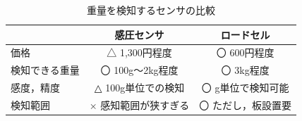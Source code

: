 \begin{table}[htb]
\begin{center}
\caption{重量を検知するセンサの比較}
\begin{tabular}{|l|c|c|} \hline
 & 感圧センサ & ロードセル \\ \hline \hline
価格 & △ 1,300円程度 & 〇 600円程度 \\
検知できる重量 & 〇 100g～2kg程度  & 〇 3kg程度 \\ 
感度，精度 & △ 100g単位での検知 & 〇 g単位で検知可能 \\
検知範囲 & × 感知範囲が狭すぎる & 〇 ただし，板設置要 \\ \hline
\end{tabular}
\label{rodo}
\end{center}
\end{table}